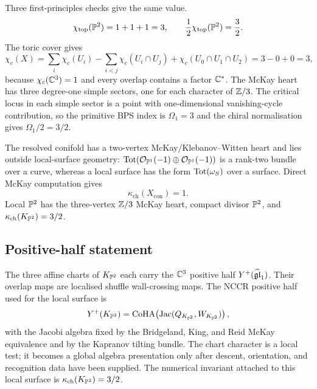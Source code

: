 Three first-principles checks give the same value.
\[
 \chi_{\mathrm{top}}(\P^2)=1+1+1=3,
 \qquad
 \frac12\chi_{\mathrm{top}}(\P^2)=\frac32.
\]
The toric cover gives
\[
 \chi_c(X)
 =\sum_i\chi_c(U_i)
 -\sum_{i<j}\chi_c(U_i\cap U_j)
 +\chi_c(U_0\cap U_1\cap U_2)
 =3-0+0=3,
\]
because $\chi_c(\C^3)=1$ and every overlap contains a factor $\C^*$.
The McKay heart has three degree-one simple sectors, one for each
character of $\Z/3$. The critical locus in each simple sector is a point
with one-dimensional vanishing-cycle contribution, so the primitive BPS
index is $\Omega_1=3$ and the chiral normalisation gives
$\Omega_1/2=3/2$.

The resolved conifold has a two-vertex McKay/Klebanov--Witten heart and
lies outside local-surface geometry:
$\Tot(\cO_{\P^1}(-1)\oplus\cO_{\P^1}(-1))$ is a rank-two bundle over a
curve, whereas a local surface has the form $\Tot(\omega_S)$ over a
surface. Direct McKay computation gives
\[
 \kappa_{\mathrm{ch}}(X_{\mathrm{con}})=1.
\]
Local $\P^2$ has the three-vertex $\Z/3$ McKay heart, compact divisor
$\P^2$, and $\kappa_{\mathrm{ch}}(K_{\P^2})=3/2$.

\subsection*{Positive-half statement}

The three affine charts of $K_{\P^2}$ each carry the
$\C^3$ positive half $Y^+(\widehat{\fgl}_1)$. Their overlap maps are
localised shuffle wall-crossing maps. The NCCR positive half used for
the local surface is
\[
 Y^+(K_{\P^2})
 =
 \CoHA\!\left(\mathrm{Jac}(Q_{K_{\P^2}},W_{K_{\P^2}})\right),
\]
with the Jacobi algebra fixed by the Bridgeland, King, and Reid McKay
equivalence and by the Kapranov tilting bundle. The chart character is a
local test; it becomes a global algebra presentation only after descent,
orientation, and recognition data have been supplied. The numerical
invariant attached to this local surface is
$\kappa_{\mathrm{ch}}(K_{\P^2})=3/2$.
